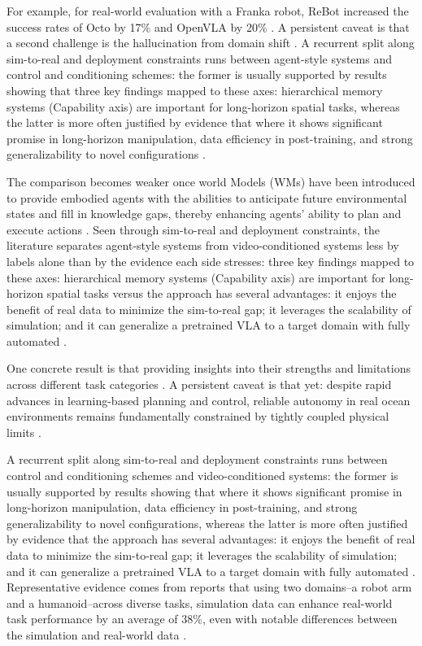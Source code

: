 \documentclass[a4paper,11pt]{article}
\begin{document}
For example, for real-world evaluation with a Franka robot, ReBot increased the success rates of Octo by 17\% and OpenVLA by 20\% \citep{Fang2025Rebot}. A persistent caveat is that a second challenge is the hallucination from domain shift \citep{Chen2025Owmm}. A recurrent split along sim-to-real and deployment constraints runs between agent-style systems and control and conditioning schemes: the former is usually supported by results showing that three key findings mapped to these axes: hierarchical memory systems (Capability axis) are important for long-horizon spatial tasks, whereas the latter is more often justified by evidence that where it shows significant promise in long-horizon manipulation, data efficiency in post-training, and strong generalizability to novel configurations \citep{Felicia2026From,Li2026Causal}.

The comparison becomes weaker once world Models (WMs) have been introduced to provide embodied agents with the abilities to anticipate future environmental states and fill in knowledge gaps, thereby enhancing agents' ability to plan and execute actions \citep{Baraldi2025Safety}. Seen through sim-to-real and deployment constraints, the literature separates agent-style systems from video-conditioned systems less by labels alone than by the evidence each side stresses: three key findings mapped to these axes: hierarchical memory systems (Capability axis) are important for long-horizon spatial tasks versus the approach has several advantages: it enjoys the benefit of real data to minimize the sim-to-real gap; it leverages the scalability of simulation; and it can generalize a pretrained VLA to a target domain with fully automated \citep{Felicia2026From,Fang2025Rebot}.

One concrete result is that providing insights into their strengths and limitations across different task categories \citep{Zhao2025Humanoid}. A persistent caveat is that yet: despite rapid advances in learning-based planning and control, reliable autonomy in real ocean environments remains fundamentally constrained by tightly coupled physical limits \citep{Xu2026Underwater}.

A recurrent split along sim-to-real and deployment constraints runs between control and conditioning schemes and video-conditioned systems: the former is usually supported by results showing that where it shows significant promise in long-horizon manipulation, data efficiency in post-training, and strong generalizability to novel configurations, whereas the latter is more often justified by evidence that the approach has several advantages: it enjoys the benefit of real data to minimize the sim-to-real gap; it leverages the scalability of simulation; and it can generalize a pretrained VLA to a target domain with fully automated \citep{Li2026Causal,Fang2025Rebot}. Representative evidence comes from reports that using two domains--a robot arm and a humanoid--across diverse tasks, simulation data can enhance real-world task performance by an average of 38\%, even with notable differences between the simulation and real-world data \citep{Maddukuri2025Real}.
\end{document}
